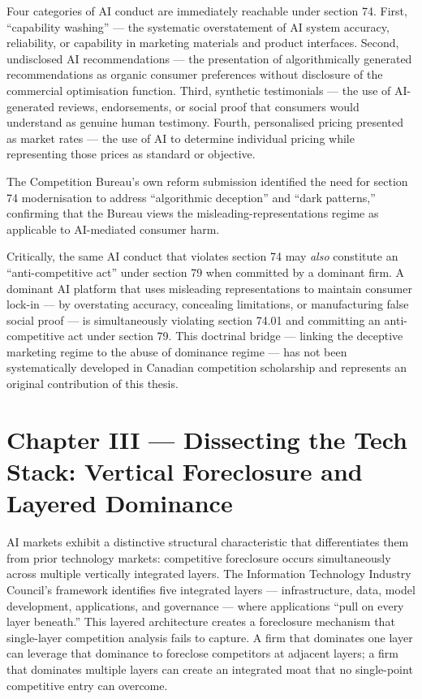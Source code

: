 Four categories of AI conduct are immediately reachable under section 74. First, ``capability washing'' --- the systematic overstatement of AI system accuracy, reliability, or capability in marketing materials and product interfaces. Second, undisclosed AI recommendations --- the presentation of algorithmically generated recommendations as organic consumer preferences without disclosure of the commercial optimisation function. Third, synthetic testimonials --- the use of AI-generated reviews, endorsements, or social proof that consumers would understand as genuine human testimony. Fourth, personalised pricing presented as market rates --- the use of AI to determine individual pricing while representing those prices as standard or objective.

The Competition Bureau's own reform submission identified the need for section 74 modernisation to address ``algorithmic deception'' and ``dark patterns,'' confirming that the Bureau views the misleading-representations regime as applicable to AI-mediated consumer harm.

Critically, the same AI conduct that violates section 74 may \textit{also} constitute an ``anti-competitive act'' under section 79 when committed by a dominant firm. A dominant AI platform that uses misleading representations to maintain consumer lock-in --- by overstating accuracy, concealing limitations, or manufacturing false social proof --- is simultaneously violating section 74.01 and committing an anti-competitive act under section 79. This doctrinal bridge --- linking the deceptive marketing regime to the abuse of dominance regime --- has not been systematically developed in Canadian competition scholarship and represents an original contribution of this thesis.


\section{Chapter III --- Dissecting the Tech Stack: Vertical Foreclosure and Layered Dominance}
\label{ch:techstack}

AI markets exhibit a distinctive structural characteristic that differentiates them from prior technology markets: competitive foreclosure occurs simultaneously across multiple vertically integrated layers. The Information Technology Industry Council's framework identifies five integrated layers --- infrastructure, data, model development, applications, and governance --- where applications ``pull on every layer beneath.'' This layered architecture creates a foreclosure mechanism that single-layer competition analysis fails to capture. A firm that dominates one layer can leverage that dominance to foreclose competitors at adjacent layers; a firm that dominates multiple layers can create an integrated moat that no single-point competitive entry can overcome.

